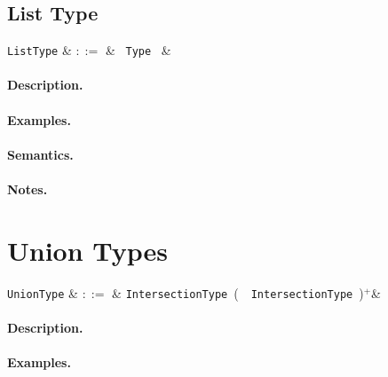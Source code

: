 
\subsection{List Type}

\begin{syntax}
  \verb+ListType+ & $::=$ & \token{[} \ \verb+Type+ \ \token{]}&\\
\end{syntax}

\paragraph{Description.}

\paragraph{Examples.}

\paragraph{Semantics.}

\paragraph{Notes.} 


\section{Union Types}

\begin{syntax}
  \verb+UnionType+ & $::=$ & \verb+IntersectionType+\ \big(\ \token{|}\ \verb+IntersectionType+\
  \big)$^+$&\\
\end{syntax}

\paragraph{Description.}

\paragraph{Examples.}

